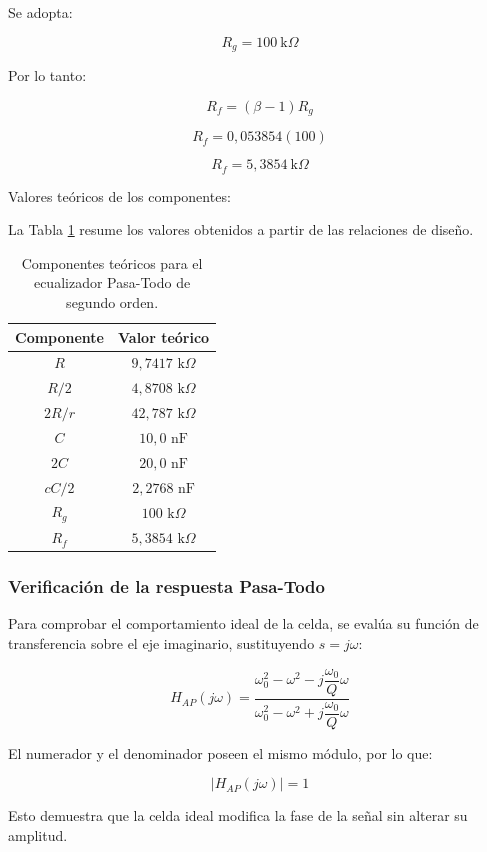 \documentclass[12pt]{article}
\begin{document}
\begin{itemize}
Se adopta:

\[
R_g=100\ \text{k}\Omega
\]

Por lo tanto:

\[
R_f=(\beta-1)R_g
\]

\[
R_f=0,053854(100)
\]

\[
\boxed{R_f=5,3854\ \text{k}\Omega}
\]

 Valores teóricos de los componentes:

La Tabla \ref{tab:componentes_ecualizador_teoricos} resume los valores obtenidos a partir de las relaciones de diseño.

\begin{table}[H]
\centering
\caption{Componentes teóricos para el ecualizador Pasa-Todo de segundo orden.}
\label{tab:componentes_ecualizador_teoricos}
\begin{tabular}{|c|c|}
\hline
\textbf{Componente} & \textbf{Valor teórico} \\ \hline
$R$       & $9,7417\text{ k}\Omega$ \\ \hline
$R/2$     & $4,8708\text{ k}\Omega$ \\ \hline
$2R/r$    & $42,787\text{ k}\Omega$ \\ \hline
$C$       & $10,0\text{ nF}$ \\ \hline
$2C$      & $20,0\text{ nF}$ \\ \hline
$cC/2$    & $2,2768\text{ nF}$ \\ \hline
$R_g$     & $100\text{ k}\Omega$ \\ \hline
$R_f$     & $5,3854\text{ k}\Omega$ \\ \hline
\end{tabular}
\end{table}


\subsubsection{Verificación de la respuesta Pasa-Todo}

Para comprobar el comportamiento ideal de la celda, se evalúa su función de transferencia sobre el eje imaginario, sustituyendo \(s=j\omega\):

\[
H_{AP}(j\omega)=
\frac{
\omega_0^2-\omega^2-j\dfrac{\omega_0}{Q}\omega
}{
\omega_0^2-\omega^2+j\dfrac{\omega_0}{Q}\omega
}
\]

El numerador y el denominador poseen el mismo módulo, por lo que:

\[
\boxed{|H_{AP}(j\omega)|=1}
\]

Esto demuestra que la celda ideal modifica la fase de la señal sin alterar su amplitud.


\end{itemize}
\end{document}
